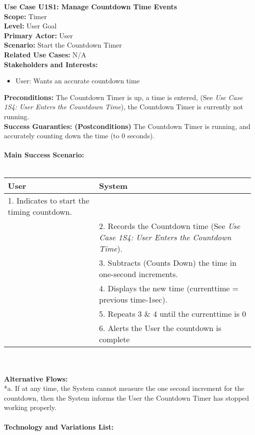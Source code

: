 \documentclass[letterpaper]{article}
\begin{document}
\noindent
\textbf{Use Case U1S1:  Manage Countdown Time Events}\\
\textbf{Scope:  }Timer\\
\textbf{Level:  }User Goal\\
\textbf{Primary Actor:  }User\\
\textbf{Scenario:  }Start the Countdown Timer\\
\textbf{Related Use Cases:  }N/A\\
\textbf{Stakeholders and Interests:}
\begin{itemize}
\item User:  Wants an accurate countdown time
\end{itemize}
\textbf{Preconditions:  }The Countdown Timer is up, a time is entered,
(See \emph{Use Case 1S4: User Enters the Countdown Time}), the Countdown Timer
is currently not running.\\
\textbf{Success Guaranties:  (Postconditions)} 
The Countdown Timer is running, and accurately counting down the time
(to 0 seconds).\\\\
\textbf{Main Success Scenario: }\\\\
\begin{tabular}{|p{6cm}|p{6cm}|}\hline
\textbf{User} & \textbf{System}\\\hline
1.  Indicates to start the timing countdown. & \\\hline
&2.  Records the Countdown time (See \textit{Use Case 1S4:  User Enters the 
Countdown Time}).\\\hline
&3.  Subtracts (Counts Down) the time in one-second increments.\\\hline
&4.  Displays the new time (currenttime = previous time-1sec).\\\hline
&5. Repeats 3 \& 4 until the currenttime is 0\\\hline
&6. Alerts the User the countdown is complete\\\hline
\end{tabular}\\\\
\textbf{Alternative Flows:  }\\
*a.  If at any time, the System cannot measure the one second increment
for the countdown, then the System informs the User the Countdown Timer
has stopped working properly.\\\\
\textbf{Technology and Variations List:  }\\
\end{document}
